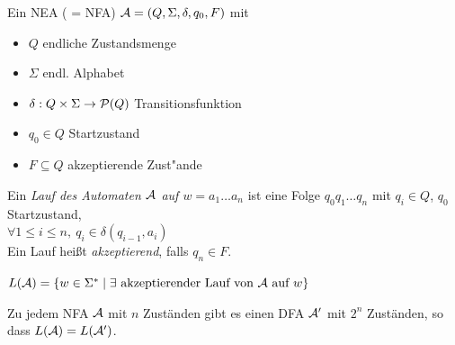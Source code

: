 \begin{Def}[name={[NEA]}]
	Ein \ac{NEA} ( = \acl{NFA}) $\mathcal{A} = (Q,\Sigma,\delta,q_0,F)$ mit
	\begin{itemize}
		\item $Q$ endliche Zustandsmenge
		\item $\Sigma$ endl. Alphabet
		\item $\delta:Q\x\Sigma\->\mathcal{P}(Q)$ Transitionsfunktion
		\item $q_0\in Q$ Startzustand
		\item $F\subseteq Q$ akzeptierende Zust"ande
	\end{itemize}
\end{Def}
\begin{Def}[name={[Lauf eines Automaten]}]
	Ein \emph{Lauf des Automaten $\mathcal{A}$ auf $w=a_1\dots a_n$} ist eine Folge $q_0q_1\dots q_n$ mit $q_i\in Q$, $q_0$ Startzustand,\\
	$\forall 1\leq i\leq n,\ q_i\in\delta(q_{i-1},a_i)$\\
	Ein Lauf heißt \emph{akzeptierend}, falls $q_n\in F$.
\end{Def}
\begin{Def}[name={[NFA zu DFA]}]
	$L(\mathcal{A})=\{ w\in\Sigma^* \mid \exists\text{ akzeptierender Lauf von $\mathcal{A}$ auf }w \}$
\end{Def}
\begin{Satz}[Rabin]
	Zu jedem \ac{NFA} $\mathcal{A}$ mit $n$ Zuständen gibt es einen \ac{DFA} $\mathcal{A}'$ mit $2^n$ Zuständen, so dass $L(\mathcal{A})=L(\mathcal{A}')$.
\end{Satz}
